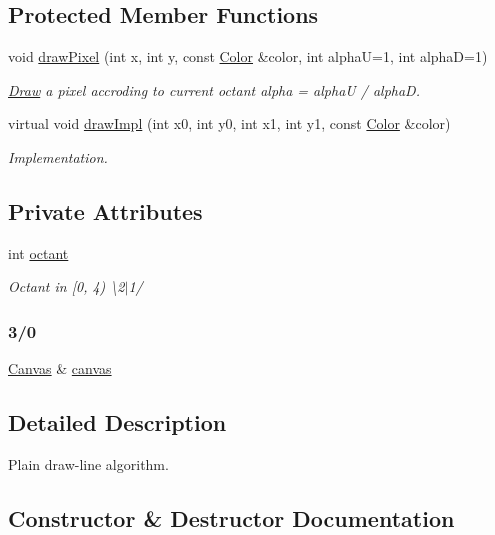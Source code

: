 \subsection*{Protected Member Functions}
\begin{DoxyCompactItemize}
\item 
void \hyperlink{classDraw_afabd95d3a324312417127a468710fd8a}{draw\+Pixel} (int x, int y, const \hyperlink{canvas_8h_a084a39206618848fb8bc9187d3758c87}{Color} \&color, int alphaU=1, int alphaD=1)
\begin{DoxyCompactList}\small\item\em \hyperlink{classDraw}{Draw} a pixel accroding to current octant alpha = alphaU / alphaD. \end{DoxyCompactList}\item 
virtual void \hyperlink{classDraw_ac9f2fe7c73db00834df73437767fa3ce}{draw\+Impl} (int x0, int y0, int x1, int y1, const \hyperlink{canvas_8h_a084a39206618848fb8bc9187d3758c87}{Color} \&color)
\begin{DoxyCompactList}\small\item\em Implementation. \end{DoxyCompactList}\end{DoxyCompactItemize}
\subsection*{Private Attributes}
\begin{DoxyCompactItemize}
\item 
int \hyperlink{classDraw_a9a0e070ec76f4f9c95fa7e717c34bdbc}{octant}
\begin{DoxyCompactList}\small\item\em Octant in \mbox{[}0, 4) \textbackslash{}2$\vert$1/ \subsubsection*{3/0 }\end{DoxyCompactList}\item 
\hyperlink{classCanvas}{Canvas} \& \hyperlink{classDraw_a72ed77716d9eb7068414f0e4e00753bd}{canvas}
\end{DoxyCompactItemize}


\subsection{Detailed Description}
Plain draw-\/line algorithm. 

\subsection{Constructor \& Destructor Documentation}
